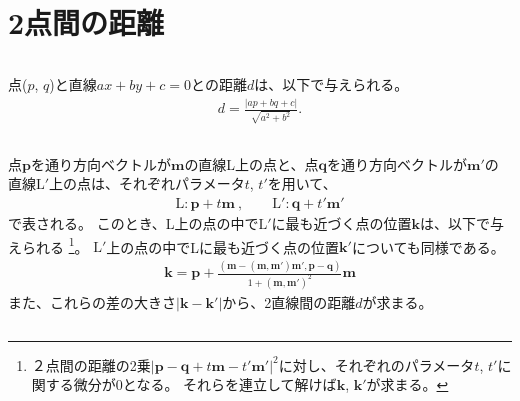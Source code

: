 




\section{2点間の距離}
\begin{Column}{}
点($p$, $q$)と直線$ax+by+c=0$との距離$d$は、以下で与えられる。
\begin{align*}
  d = \frac{|ap+bq+c|}{\sqrt{a^2+b^2}}.
\end{align*}
\end{Column}
\begin{Column}{}
点$\boldsymbol p$を通り方向ベクトルが$\boldsymbol m$の直線L上の点と、点$\boldsymbol q$を通り方向ベクトルが$\boldsymbol m'$の直線$\mathrm L'$上の点は、それぞれパラメータ$t$, $t'$を用いて、
\begin{align*}
  \mathrm L: \boldsymbol p+t\boldsymbol m\ , \qquad
  \mathrm L': \boldsymbol q+t'\boldsymbol m'
\end{align*}
で表される。
このとき、L上の点の中で$\mathrm L'$に最も近づく点の位置$\boldsymbol k$は、以下で与えられる
\footnote{２点間の距離の2乗$|\boldsymbol p-\boldsymbol q+t\boldsymbol m-t'\boldsymbol m'|^2$に対し、それぞれのパラメータ$t$, $t'$に関する微分が0となる。
それらを連立して解けば$\boldsymbol k$, $\boldsymbol k'$が求まる。}。
$\mathrm L'$上の点の中でLに最も近づく点の位置$\boldsymbol k'$についても同様である。
\begin{align*}
  \boldsymbol k
  = \boldsymbol p
    +\frac{(\boldsymbol m-(\boldsymbol m, \boldsymbol m')\boldsymbol m', \boldsymbol p-\boldsymbol q)}
          {1+(\boldsymbol m, \boldsymbol m')^2}\boldsymbol m
\end{align*}
また、これらの差の大きさ$|\boldsymbol k-\boldsymbol k'|$から、2直線間の距離$d$が求まる。
\end{Column}
